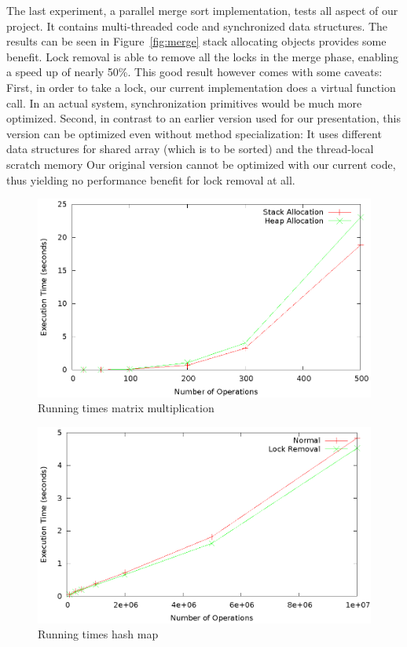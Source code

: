 \documentclass[letterpaper]{article}
\begin{document}
The last experiment, a parallel merge sort implementation, tests all aspect of our project. It contains multi-threaded code and synchronized
data structures. The results can be seen in Figure~\ref{fig:merge} stack allocating objects provides some benefit.
Lock removal is able to remove all the locks in the merge phase, enabling a speed up of nearly 50\%. This
good result however comes with some caveats: First, in order to take a lock, our current implementation does a virtual function call. In
an actual system, synchronization primitives would be much more optimized. Second, in contrast to an earlier version used for our
presentation, this version can be optimized even without method specialization: It uses different data structures for shared array
(which is to be sorted) and the thread-local scratch memory 
Our original version cannot be optimized with our current code, thus yielding no performance benefit for lock removal at all.


\begin{figure} \center
 \includegraphics[width=0.8\linewidth]{results_matrix_mul.eps}
  \caption{Running times matrix multiplication}
  \label{fig:matrixmul}
\end{figure}

\begin{figure} \center
 \includegraphics[width=0.8\linewidth]{results_hash.eps}
  \caption{Running times hash map}
  \label{fig:hash}
\end{figure}
\end{document}
